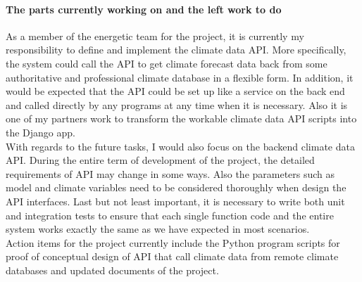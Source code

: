 \documentclass[onecolumn, draftclsnofoot,10pt, compsoc]{article}
\begin{document}
		\paragraph{The parts currently working on and the left work to do} \hfill \break
		As a member of the energetic team for the project, it is currently my responsibility to define and implement the climate data API. More specifically, the system could call the API to get climate forecast data back from some authoritative and professional climate database in a flexible form. In addition, it would be expected that the API could be set up like a service on the back end and called directly by any programs at any time when it is necessary. Also it is one of my partners work to transform the workable climate data API scripts into the Django app. \\
		With regards to the future tasks, I would also focus on the backend climate data API. During the entire term of development of the project, the detailed requirements of API may change in some ways. Also the parameters such as model and climate variables need to be considered thoroughly when design the API interfaces. Last but not least important, it is necessary to write both unit and integration tests to ensure that each single function code and the entire system works exactly the same as we have expected in most scenarios.\\
		Action items for the project currently include the Python program scripts for proof of conceptual design of API that call climate data from remote climate databases and updated documents of the project.\\
\end{document}
